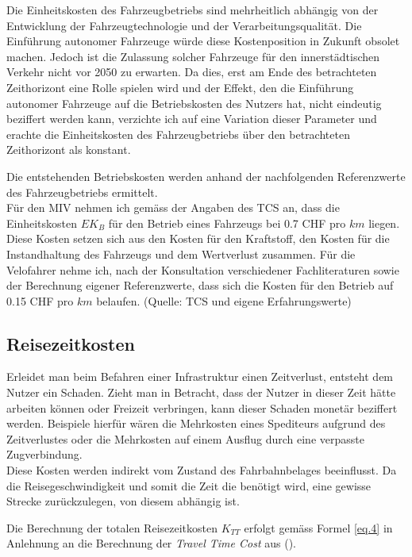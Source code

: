Die Einheitskosten des Fahrzeugbetriebs sind mehrheitlich abhängig von der Entwicklung der Fahrzeugtechnologie und der Verarbeitungsqualität. Die Einführung autonomer Fahrzeuge würde diese Kostenposition in Zukunft obsolet machen. Jedoch ist die Zulassung solcher Fahrzeuge für den innerstädtischen Verkehr nicht vor 2050 zu erwarten. Da dies, erst am Ende des betrachteten Zeithorizont eine Rolle spielen wird und der Effekt, den die Einführung autonomer Fahrzeuge auf die Betriebskosten des Nutzers hat, nicht eindeutig beziffert werden kann, verzichte ich auf eine Variation dieser Parameter und erachte die Einheitskosten des Fahrzeugbetriebs über den betrachteten Zeithorizont als konstant.

Die entstehenden Betriebskosten werden anhand der nachfolgenden Referenzwerte des Fahrzeugbetriebs ermittelt. \\
Für den MIV nehmen ich gemäss der Angaben des TCS an, dass die Einheitskosten $EK_{B}$  für den Betrieb eines Fahrzeugs bei 0.7 CHF pro $km$ liegen. Diese Kosten setzen sich aus den Kosten für den Kraftstoff, den Kosten für die Instandhaltung des Fahrzeugs und dem Wertverlust zusammen. Für die Velofahrer nehme ich, nach der Konsultation verschiedener Fachliteraturen sowie der Berechnung eigener Referenzwerte, dass sich die Kosten für den Betrieb auf 0.15 CHF pro $km$ belaufen. (Quelle: TCS und eigene Erfahrungswerte)




\subsection*{Reisezeitkosten}
\label{sub:Reisezeit}

Erleidet man beim Befahren einer Infrastruktur einen Zeitverlust, entsteht dem Nutzer ein Schaden. Zieht man in Betracht, dass der Nutzer in dieser Zeit hätte arbeiten können oder Freizeit verbringen, kann dieser Schaden monetär beziffert werden. Beispiele hierfür wären die Mehrkosten eines Spediteurs aufgrund des Zeitverlustes oder die Mehrkosten auf einem Ausflug durch eine verpasste Zugverbindung. \\
Diese Kosten werden indirekt vom Zustand des Fahrbahnbelages beeinflusst. Da die Reisegeschwindigkeit und somit die Zeit die benötigt wird, eine gewisse Strecke zurückzulegen, von diesem abhängig ist.

Die Berechnung der totalen Reisezeitkosten $K_{TT}$ erfolgt gemäss Formel \ref{eq.4} in Anlehnung an die Berechnung der \textit{Travel Time Cost} aus (\cite[S.643]{Adey2012}).

